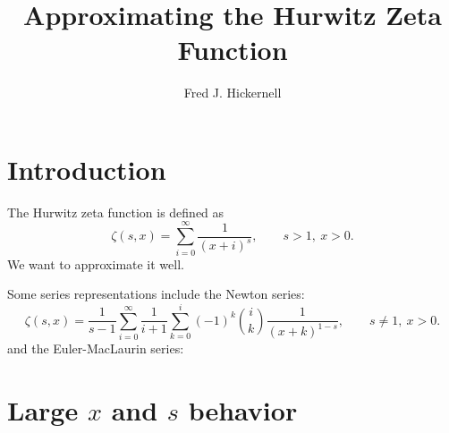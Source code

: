 \documentclass{amsart}
\title{Approximating the Hurwitz Zeta Function}
\author{Fred J. Hickernell}
\begin{document}
\maketitle

\section{Introduction}

The Hurwitz zeta function is defined as
\[
\zeta(s,x) =\sum _{i=0}^{\infty }\frac  {1}{(x+i)^{s}}, \qquad s > 1, \ x > 0.
\]
We want to approximate it well.

Some series representations include the Newton series:
\[
\zeta(s,x) = \frac{1}{s-1} \sum _{i=0}^{\infty }\frac 1{i+1} \sum_{k=0}^i (-1)^k \binom{i}{k} \frac  {1}{(x+k)^{1-s}}, \qquad s \ne 1, \ x > 0.
\]
and the Euler-MacLaurin series:


\section{Large $x$ and $s$ behavior}
\end{document}
